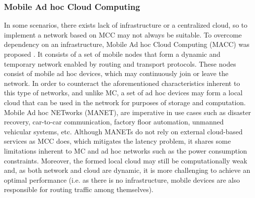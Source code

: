 \subsubsection{Mobile Ad hoc Cloud Computing}
In some scenarios, there exists lack of infrastructure or a centralized cloud, so to implement a network based on MCC may not always be suitable. To overcome dependency on an infrastructure, Mobile Ad hoc Cloud Computing (MACC) was proposed \cite{hubaux2001toward}. It consists of a set of mobile nodes that form a dynamic and temporary network enabled by routing and transport protocols. These nodes consist of mobile ad hoc devices, which may continuously join or leave the network. In order to counteract the aforementioned characteristics inherent to this type of networks, and unlike MC, a set of ad hoc devices may form a local cloud that can be used in the network for purposes of storage and computation. Mobile Ad hoc NETworks (MANET), are imperative in use cases such as disaster recovery, car-to-car communication, factory floor automation, unmanned vehicular systems, etc. Although MANETs do not rely on external cloud-based services as MCC does, which mitigates the latency problem, it shares some limitations inherent to MC and ad hoc networks such as the power consumption constraints. Moreover, the formed local cloud may still be computationally weak and, as both network and cloud are dynamic, it is more challenging to achieve an optimal performance (i.e. as there is no infrastructure, mobile devices are also responsible for routing traffic among themselves).


